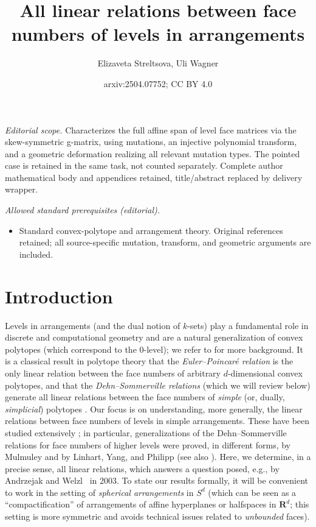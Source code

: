 \documentclass[11pt]{article}
\title{All linear relations between face numbers of levels in arrangements}
\author{Elizaveta Streltsova, Uli Wagner}
\date{arxiv:2504.07752; CC BY 4.0}
\newcommand{\R}{\mathbf{R}}
\begin{document}
\maketitle
\noindent\textit{Editorial scope.} Characterizes the full affine span of level face matrices via the skew-symmetric g-matrix, using mutations, an injective polynomial transform, and a geometric deformation realizing all relevant mutation types. The pointed case is retained in the same task, not counted separately. Complete author mathematical body and appendices retained, title/abstract replaced by delivery wrapper.\par\medskip
\noindent\textit{Allowed standard prerequisites (editorial).}\begin{itemize}
\item Standard convex-polytope and arrangement theory. Original references retained; all source-specific mutation, transform, and geometric arguments are included.
\end{itemize}\medskip
\section{Introduction}
\label{s:intro}
Levels in arrangements (and the dual notion of $k$-sets) play a fundamental role in discrete and computational geometry %
and %
are a natural generalization of convex polytopes (which correspond to the $0$-level); we refer to  \cite{Edelsbrunner:1987aa,Matousek:2002aa,Wagner:2008aa} for more background.
%
It is a classical result in polytope theory that the \emph{Euler--Poincaré relation} is the only linear relation between the face numbers of arbitrary $d$-dimensional convex polytopes, and that the \emph{Dehn--Sommerville relations} 
(which we will review below) 
generate all linear relations between the face numbers of \emph{simple} (or, dually, \emph{simplicial}) polytopes \cite[Chs.~8--9]{Grunbaum:2003aa}. 
%
Our focus is on understanding, more generally, the linear relations between face numbers of levels in simple arrangements. These have been studied extensively \cite{Mulmuley:1993aa,Gulliksen:1997aa,Linhart:2000aa,Andrzejak:2003aa,Biswas:2024aa}; in particular, 
generalizations of the Dehn--Sommerville relations for face numbers of higher levels were proved, in different forms, by Mulmuley \cite{Mulmuley:1993aa} and by Linhart, Yang, and Philipp \cite{Linhart:2000aa} (see also \cite{Biswas:2024aa}). Here, we determine, in a precise sense, all linear relations, which answers a question posed, e.g., by Andrzejak and Welzl~\cite{Andrzejak:2003aa} in 2003. To state our results formally, it will be convenient to work in the setting of \emph{spherical arrangements} in $S^d$ (which can be seen as a ``compactification'' of arrangements of affine hyperplanes or halfspaces in $\R^d$; this setting is more symmetric and avoids technical issues related to \emph{unbounded} faces). 
%
\end{document}
